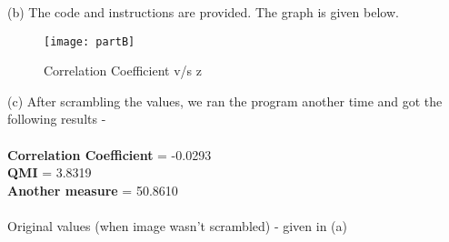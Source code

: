 \documentclass[11pt]{article}
\begin{document}
\begin{enumerate}
{		(b) The code and instructions are provided. The graph is given below.
		\begin{figure}[H]
		\caption{Correlation Coefficient v/s z}
		\centering
		\texttt{[image: partB]}
		\end{figure}
		
		(c) After scrambling the values, we ran the program another time and got the following results - \\ \\
		\textbf{Correlation Coefficient} = -0.0293 \\
		\textbf{QMI} = 3.8319 \\
		\textbf{Another measure} = 50.8610 \\ \\ 
		Original values (when image wasn't scrambled) - given in (a)


		}
\end{enumerate}
\end{document}
